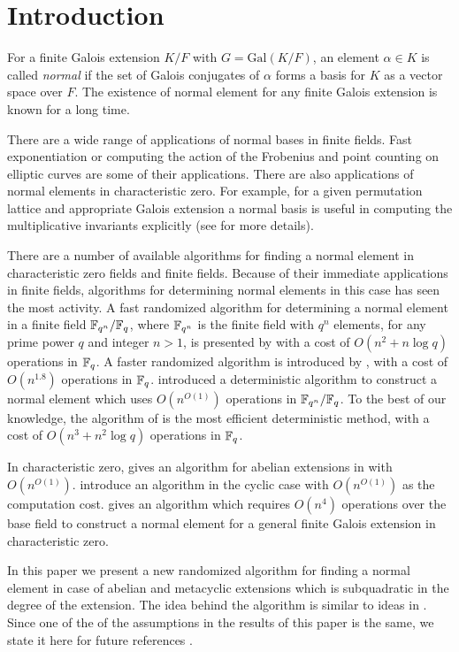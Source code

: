 \section{Introduction}

For a finite Galois extension $K/F$ with $G = \mathrm{Gal}(K/F)$, an
element $\alpha \in K$ is called \emph{normal} if the set of Galois
conjugates of $\alpha$ forms a basis for $K$ as a vector space over
$F$. The existence of normal element for any finite Galois extension is
known for a long time.
 
There are a wide range of applications of normal bases in finite
fields. Fast exponentiation or computing the action of the Frobenius and
point counting on elliptic curves are some of their applications. There are
also applications of normal elements in characteristic zero. For example,
for a given permutation lattice and appropriate Galois extension a normal
basis is useful in computing the multiplicative invariants explicitly (see
\cite{Armin} for more details).

There are a number of available algorithms for finding a normal element in
characteristic zero fields and finite fields.  Because of their immediate
applications in finite fields, algorithms for determining normal elements
in this case has seen the most activity.  A fast randomized algorithm for
determining a normal element in a finite field $\mathbb{F}_{q^n}/\mathbb{F}_q$, where
$\mathbb{F}_{q^n}$ is the finite field with $q^n$ elements, for any prime power
$q$ and integer $n>1$, is presented by  with a cost of
$O(n^2+n\log q)$ operations in $\mathbb{F}_q$.  A faster randomized algorithm is
introduced by , with a cost of $O(n^{1.8})$ operations in
$\mathbb{F}_q$.   introduced a deterministic algorithm to
construct a normal element which uses $O(n^{O(1)})$ operations in
$\mathbb{F}_{q^n}/\mathbb{F}_q$.  To the best of our knowledge, the algorithm of
 is the most efficient deterministic method, with a cost of
$O(n^3+n^2\log q)$ operations in $\mathbb{F}_q$.

In characteristic zero,  gives an algorithm for abelian
extensions in with $O(n^{O(1)})$.   introduce an algorithm
in the cyclic case with $O(n^{O(1)})$ as the computation cost.
 gives an algorithm which requires $O(n^4)$ operations
over the base field to construct a normal element for a general finite
Galois extension in characteristic zero.

In this paper we present a new randomized algorithm for finding a normal
element in case of abelian and metacyclic extensions which is subquadratic
in the degree of the extension. The idea behind the algorithm is similar to
ideas in \cite{Giesbrecht,Kaltofen}. Since one of the of the assumptions in
the results of this paper is the same, we state it here for future
references .

